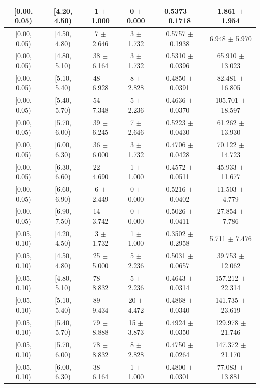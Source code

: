 \begin{longtable}{|c|c|c|c|c|c|}
\hline
\endlastfoot
[0.00, 0.05) & [4.20, 4.50) & 1 $\pm$ 1.000 & 0 $\pm$ 0.000 & 0.5373 $\pm$ 0.1718 & 1.861 $\pm$ 1.954 \\ 
\hline
[0.00, 0.05) & [4.50, 4.80) & 7 $\pm$ 2.646 & 3 $\pm$ 1.732 & 0.5757 $\pm$ 0.1938 & 6.948 $\pm$ 5.970 \\ 
\hline
[0.00, 0.05) & [4.80, 5.10) & 38 $\pm$ 6.164 & 3 $\pm$ 1.732 & 0.5310 $\pm$ 0.0396 & 65.910 $\pm$ 13.023 \\ 
\hline
[0.00, 0.05) & [5.10, 5.40) & 48 $\pm$ 6.928 & 8 $\pm$ 2.828 & 0.4850 $\pm$ 0.0391 & 82.481 $\pm$ 16.805 \\ 
\hline
[0.00, 0.05) & [5.40, 5.70) & 54 $\pm$ 7.348 & 5 $\pm$ 2.236 & 0.4636 $\pm$ 0.0370 & 105.701 $\pm$ 18.597 \\ 
\hline
[0.00, 0.05) & [5.70, 6.00) & 39 $\pm$ 6.245 & 7 $\pm$ 2.646 & 0.5223 $\pm$ 0.0430 & 61.262 $\pm$ 13.930 \\ 
\hline
[0.00, 0.05) & [6.00, 6.30) & 36 $\pm$ 6.000 & 3 $\pm$ 1.732 & 0.4706 $\pm$ 0.0428 & 70.122 $\pm$ 14.723 \\ 
\hline
[0.00, 0.05) & [6.30, 6.60) & 22 $\pm$ 4.690 & 1 $\pm$ 1.000 & 0.4572 $\pm$ 0.0511 & 45.933 $\pm$ 11.677 \\ 
\hline
[0.00, 0.05) & [6.60, 6.90) & 6 $\pm$ 2.449 & 0 $\pm$ 0.000 & 0.5216 $\pm$ 0.0402 & 11.503 $\pm$ 4.779 \\ 
\hline
[0.00, 0.05) & [6.90, 7.50) & 14 $\pm$ 3.742 & 0 $\pm$ 0.000 & 0.5026 $\pm$ 0.0411 & 27.854 $\pm$ 7.786 \\ 
\hline
[0.05, 0.10) & [4.20, 4.50) & 3 $\pm$ 1.732 & 1 $\pm$ 1.000 & 0.3502 $\pm$ 0.2958 & 5.711 $\pm$ 7.476 \\ 
\hline
[0.05, 0.10) & [4.50, 4.80) & 25 $\pm$ 5.000 & 5 $\pm$ 2.236 & 0.5031 $\pm$ 0.0657 & 39.753 $\pm$ 12.062 \\ 
\hline
[0.05, 0.10) & [4.80, 5.10) & 78 $\pm$ 8.832 & 5 $\pm$ 2.236 & 0.4643 $\pm$ 0.0314 & 157.212 $\pm$ 22.314 \\ 
\hline
[0.05, 0.10) & [5.10, 5.40) & 89 $\pm$ 9.434 & 20 $\pm$ 4.472 & 0.4868 $\pm$ 0.0340 & 141.735 $\pm$ 23.619 \\ 
\hline
[0.05, 0.10) & [5.40, 5.70) & 79 $\pm$ 8.888 & 15 $\pm$ 3.873 & 0.4924 $\pm$ 0.0350 & 129.978 $\pm$ 21.746 \\ 
\hline
[0.05, 0.10) & [5.70, 6.00) & 78 $\pm$ 8.832 & 8 $\pm$ 2.828 & 0.4750 $\pm$ 0.0264 & 147.372 $\pm$ 21.170 \\ 
\hline
[0.05, 0.10) & [6.00, 6.30) & 38 $\pm$ 6.164 & 1 $\pm$ 1.000 & 0.4800 $\pm$ 0.0301 & 77.083 $\pm$ 13.881 \\ 

\end{longtable}
